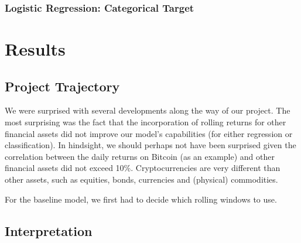\documentclass[12pt,twoside]{article}
\begin{document}
\subsubsection{Logistic Regression: Categorical Target}

\section{Results}

\subsection{Project Trajectory}

We were surprised with several developments along the way of our project. The most surprising was the fact that the incorporation of rolling returns for other financial assets did not improve our model's capabilities (for either regression or classification). In hindsight, we should perhaps not have been surprised given the correlation between the daily returns on Bitcoin (as an example) and other financial assets did not exceed 10\%. Cryptocurrencies are very different than other assets, such as equities, bonds, currencies and (physical) commodities.

For the baseline model, we first had to decide which rolling windows to use.

\subsection{Interpretation}
\end{document}
